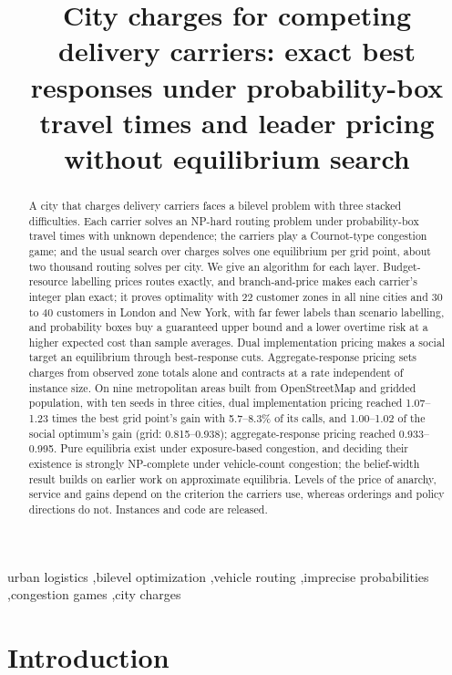 \documentclass[preprint,11pt]{elsarticle}
\theoremstyle{definition}
\theoremstyle{remark}
\begin{document}
\begin{frontmatter}
\date{}

\title{City charges for competing delivery carriers: exact best responses under probability-box travel times and leader pricing without equilibrium search}

\begin{abstract}
A city that charges delivery carriers faces a bilevel problem with three stacked difficulties. Each carrier solves an NP-hard routing problem under probability-box travel times with unknown dependence; the carriers play a Cournot-type congestion game; and the usual search over charges solves one equilibrium per grid point, about two thousand routing solves per city. We give an algorithm for each layer. Budget-resource labelling prices routes exactly, and branch-and-price makes each carrier's integer plan exact; it proves optimality with 22 customer zones in all nine cities and 30 to 40 customers in London and New York, with far fewer labels than scenario labelling, and probability boxes buy a guaranteed upper bound and a lower overtime risk at a higher expected cost than sample averages. Dual implementation pricing makes a social target an equilibrium through best-response cuts. Aggregate-response pricing sets charges from observed zone totals alone and contracts at a rate independent of instance size. On nine metropolitan areas built from OpenStreetMap and gridded population, with ten seeds in three cities, dual implementation pricing reached 1.07--1.23 times the best grid point's gain with 5.7--8.3\% of its calls, and 1.00--1.02 of the social optimum's gain (grid: 0.815--0.938); aggregate-response pricing reached 0.933--0.995. Pure equilibria exist under exposure-based congestion, and deciding their existence is strongly NP-complete under vehicle-count congestion; the belief-width result builds on earlier work on approximate equilibria. Levels of the price of anarchy, service and gains depend on the criterion the carriers use, whereas orderings and policy directions do not. Instances and code are released.
\end{abstract}

\begin{keyword}
urban logistics \sep bilevel optimization \sep vehicle routing \sep imprecise probabilities \sep congestion games \sep city charges
\end{keyword}

\end{frontmatter}

\section{Introduction}\label{sec:intro}
\end{document}
